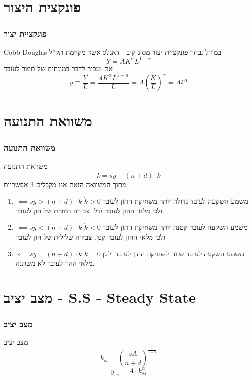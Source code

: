 \documentclass[usenames,dvipsnames, 10pt]{beamer}
\begin{document}
\begin{RTL}
\begin{frame}[allowframebreaks]
\end{frame}


\section{פונקצית היצור}
\begin{frame}
    \frametitle{פונקציית יצור}
    \begin{block}{Cobb-Douglas}
        במודל נבחר פונקציית יצור מסוג קוב - דאגלס אשר מקיימת תק''ל
        \[Y = A K^\alpha L ^{1-\alpha}\]
        אם נעבור לדבר במונחים של תוצר לעובד
        \[y \equiv \frac{Y}{L} = \frac{ A K^\alpha L ^{1-\alpha}}{L} = A \left (\frac{K}{L} \right )^\alpha = A k^\alpha\]
    \end{block}
\end{frame}

\section{משוואת התנועה}

\begin{frame}
    \frametitle{משוואת התנועה}
    \begin{block}{משוואת התנועה}
        \begin{equation*}
            \dot k = sy - (n+d)\cdot k
        \end{equation*}
        מתוך המשוואה הזאת אנו מקבלים 3 אפשריות
        \begin{enumerate}
            \item $\impliedby sy > (n+d) \cdot k  $ $\dot k > 0$ משמע השקעה לעובד גדולה יותר משחיקת ההון לעובד ולכן מלאי ההון לעובד גדל. צבירה חיובית של הון לעובד
            \item $\impliedby sy < (n+d) \cdot k  $ $\dot k < 0$ משמע השקעה לעובד קטנה יותר משחיקת ההון לעובד ולכן מלאי ההון לעובד קטן. צבירה שלילית של הון לעובד
            \item $\impliedby sy = (n+d) \cdot k  $ $\dot k = 0$ משמע השקעה לעובד שווה לשחיקת ההון לעובד ולכן מלאי ההון לעובד לא משתנה.
        \end{enumerate}
    \end{block}
\end{frame}



\section{מצב יציב - S.S - Steady State}
\begin{frame}[allowframebreaks]
    \frametitle{מצב יציב}
    \begin{block}{מצב יציב}
        \begin{equation}
            k_{ss} = \left(\frac{sA}{n+d}\right) ^ {\frac{1}{1-\alpha}}
        \end{equation}
        \begin{equation}
            y_{ss} = A \cdot k_{ss}^\alpha
        \end{equation}
        

\end{block}
\end{frame}
\end{RTL}
\end{document}
